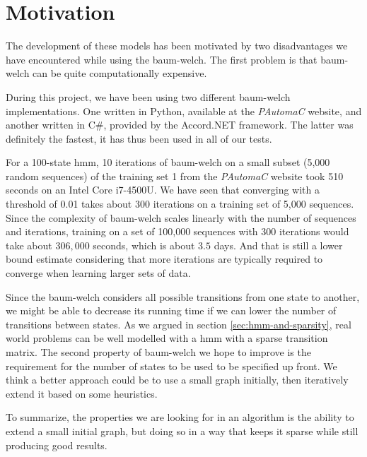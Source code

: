 \section{Motivation}
The development of these models has been motivated by two disadvantages we have encountered while using the \gls{baum-welch}.
The first problem is that \gls{baum-welch} can be quite computationally expensive.

During this project, we have been using two different \gls{baum-welch} implementations. One written in Python, available at the \emph{PAutomaC} website, and another written in C\#, provided by the Accord.NET framework. The latter was definitely the fastest, it has thus been used in all of our tests.

For a 100-state \gls{hmm}, 10 iterations of \gls{baum-welch} on a small subset (5,000 random sequences) of the training set 1 from the \emph{PAutomaC} website took 510 seconds on an Intel Core i7-4500U. We have seen that converging with a threshold of 0.01 takes about 300 iterations on a training set of 5,000 sequences. Since the complexity of \gls{baum-welch} scales linearly with the number of sequences and iterations, training on a set of 100,000 sequences with 300 iterations would take about $306,000$ seconds, which is about $3.5$ days. And that is still a lower bound estimate considering that more iterations are typically required to converge when learning larger sets of data.

Since the \gls{baum-welch} considers all possible transitions from one state to another, we might be able to decrease its running time if we can lower the number of transitions between states. As we argued in section \ref{sec:hmm-and-sparsity}, real world problems can be well modelled with a \gls{hmm} with a sparse transition matrix.
The second property of \gls{baum-welch} we hope to improve is the requirement for the number of states to be used to be specified up front.
We think a better approach could be to use a small graph initially, then iteratively extend it based on some heuristics.

To summarize, the properties we are looking for in an algorithm is the ability to extend a small initial graph, but doing so in a way that keeps it sparse while still producing good results.